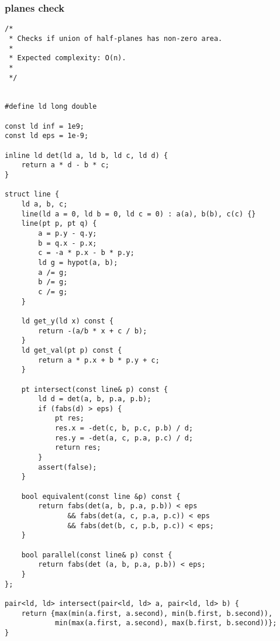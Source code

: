 \subsubsection{planes check}
\begin{lstlisting}
/*
 * Checks if union of half-planes has non-zero area.
 *
 * Expected complexity: O(n).
 *
 */


#define ld long double

const ld inf = 1e9;
const ld eps = 1e-9;

inline ld det(ld a, ld b, ld c, ld d) {
    return a * d - b * c;
}

struct line {
    ld a, b, c;
    line(ld a = 0, ld b = 0, ld c = 0) : a(a), b(b), c(c) {}
    line(pt p, pt q) {
        a = p.y - q.y;
        b = q.x - p.x;
        c = -a * p.x - b * p.y;
        ld g = hypot(a, b);
        a /= g;
        b /= g;
        c /= g;
    }

    ld get_y(ld x) const {
        return -(a/b * x + c / b);
    }
    ld get_val(pt p) const {
        return a * p.x + b * p.y + c;
    }

    pt intersect(const line& p) const {
        ld d = det(a, b, p.a, p.b);
        if (fabs(d) > eps) {
            pt res;
            res.x = -det(c, b, p.c, p.b) / d;
            res.y = -det(a, c, p.a, p.c) / d;
            return res;
        }
        assert(false);
    }

    bool equivalent(const line &p) const {
        return fabs(det(a, b, p.a, p.b)) < eps
               && fabs(det(a, c, p.a, p.c)) < eps
               && fabs(det(b, c, p.b, p.c)) < eps;
    }

    bool parallel(const line& p) const {
        return fabs(det (a, b, p.a, p.b)) < eps;
    }
};

pair<ld, ld> intersect(pair<ld, ld> a, pair<ld, ld> b) {
    return {max(min(a.first, a.second), min(b.first, b.second)),
            min(max(a.first, a.second), max(b.first, b.second))};
}


\end{lstlisting}
